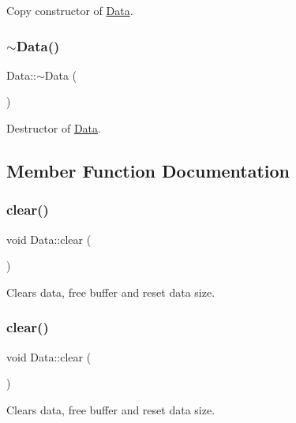 Copy constructor of \hyperlink{classData}{Data}. \mbox{\label{classData_aab31956423290f0d62dcca47ab4d16dd}} 
\subsubsection{\texorpdfstring{$\sim$\+Data()}{~Data()}\hspace{0.1cm}{\footnotesize\ttfamily [2/2]}}
{\footnotesize\ttfamily Data\+::$\sim$\+Data (\begin{DoxyParamCaption}{ }\end{DoxyParamCaption})}

Destructor of \hyperlink{classData}{Data}. 

\subsection{Member Function Documentation}
\mbox{\label{classData_a44b749f64ffa35e034f9503fdec4917e}} 
\subsubsection{\texorpdfstring{clear()}{clear()}\hspace{0.1cm}{\footnotesize\ttfamily [1/2]}}
{\footnotesize\ttfamily void Data\+::clear (\begin{DoxyParamCaption}{ }\end{DoxyParamCaption})}

Clears data, free buffer and reset data size. \mbox{\label{classData_a44b749f64ffa35e034f9503fdec4917e}} 
\subsubsection{\texorpdfstring{clear()}{clear()}\hspace{0.1cm}{\footnotesize\ttfamily [2/2]}}
{\footnotesize\ttfamily void Data\+::clear (\begin{DoxyParamCaption}{ }\end{DoxyParamCaption})}

Clears data, free buffer and reset data size. \mbox{\label{classData_a11d09c86fa7696d0cd89c0fe08970bf8}} 
